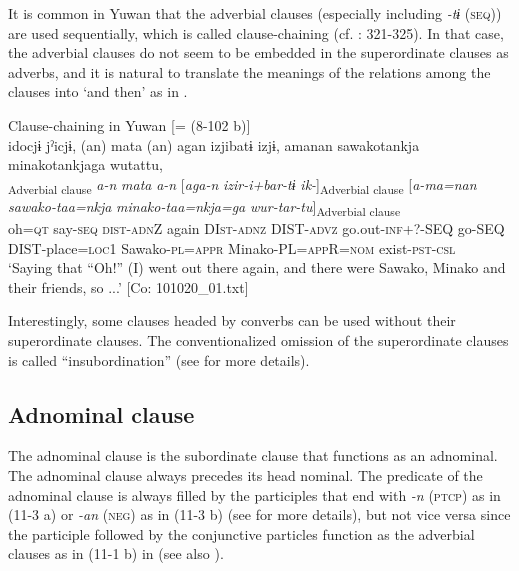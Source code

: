 It is common in Yuwan that the adverbial clauses (especially including \textit{{}-tɨ} (\textsc{seq})) are used sequentially, which is called clause-chaining (cf. \citealt{Payne1997}: 321-325). In that case, the adverbial clauses do not seem to be embedded in the superordinate clauses as adverbs, and it is natural to translate the meanings of the relations among the clauses into ‘and then’ as in .

\ea\label{ex:11-2}  Clause-chaining in Yuwan [= (8-102 b)]\\
    \glll idocjɨ  jˀicjɨ,  (an)  mata  (an)  agan izjibatɨ  izjɨ,  amanan  sawakotankja minakotankjaga  wutattu,\\
    [\textit{ido=ccjɨ}  \textit{jˀ-\Highlight{tɨ}}]\textsubscript{Adverbial clause}  \textit{a-n}  \textit{mata}  \textit{a-n}  [\textit{aga-n} \textit{izir-i+bar-tɨ}  \textit{ik-}]\textsubscript{Adverbial clause}\textbf{  }[\textit{a-ma=nan}  \textit{sawako-taa=nkja}  \textit{minako-taa=nkja=ga}  \textit{wur-tar-tu}]\textsubscript{Adverbial clause}\\
    oh=\textsc{qt}  say-\textsc{seq}  \textsc{dist}-\textsc{adn}Z  again  DI\textsc{st}-\textsc{adnz}  DIST-\textsc{advz} go.out-\textsc{inf}+?-SEQ  go-SEQ  DIST-place=\textsc{loc}1  Sawako-\textsc{pl}=\textsc{appr} Minako-PL=\textsc{app}R=\textsc{nom}  exist-\textsc{pst}-\textsc{csl}\\
    \glt ‘Saying that “Oh!” (I) went out there again, and there were Sawako, Minako and their friends, so ...’ [Co: 101020\_01.txt]
\z

Interestingly, some clauses headed by converbs can be used without their superordinate clauses. The conventionalized omission of the superordinate clauses is called “insubordination” (see  for more details).

\subsection{Adnominal clause}\label{sec:11.1.2}

The adnominal clause is the subordinate clause that functions as an adnominal. The adnominal clause always precedes its head nominal. The predicate of the adnominal clause is always filled by the participles that end with \textit{{}-n} (\textsc{ptcp}) as in (11-3 a) or \textit{{}-an} (\textsc{neg}) as in (11-3 b) (see  for more details), but not vice versa since the participle followed by the conjunctive particles function as the adverbial clauses as in (11-1 b) in  (see also ).

